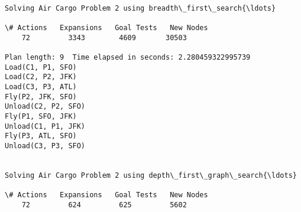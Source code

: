 \documentclass[11pt]{article}
\begin{document}
    \begin{Verbatim}[commandchars=\\\{\}]

Solving Air Cargo Problem 2 using breadth\_first\_search{\ldots}

\# Actions   Expansions   Goal Tests   New Nodes
    72         3343        4609       30503   

Plan length: 9  Time elapsed in seconds: 2.280459322995739
Load(C1, P1, SFO)
Load(C2, P2, JFK)
Load(C3, P3, ATL)
Fly(P2, JFK, SFO)
Unload(C2, P2, SFO)
Fly(P1, SFO, JFK)
Unload(C1, P1, JFK)
Fly(P3, ATL, SFO)
Unload(C3, P3, SFO)


Solving Air Cargo Problem 2 using depth\_first\_graph\_search{\ldots}

\# Actions   Expansions   Goal Tests   New Nodes
    72         624         625         5602   


\end{Verbatim}
\end{document}
